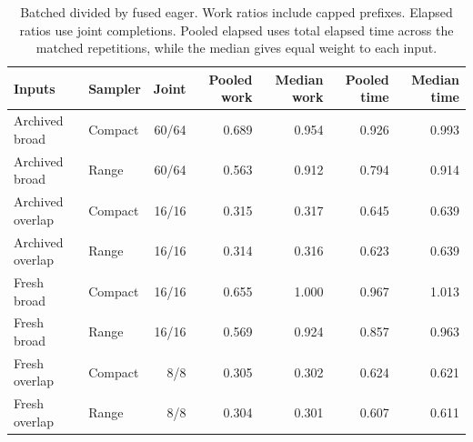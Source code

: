 \begin{table}[ht]\centering\small
\caption{Batched divided by fused eager. Work ratios include capped prefixes. Elapsed ratios use joint completions. Pooled elapsed uses total elapsed time across the matched repetitions, while the median gives equal weight to each input.}
\label{tab:actual-batch}
\begin{tabular}{@{}llrrrrr@{}}\toprule
Inputs & Sampler & Joint & Pooled work & Median work & Pooled time & Median time\\\midrule
Archived broad & Compact & 60/64 & 0.689 & 0.954 & 0.926 & 0.993\\
Archived broad & Range & 60/64 & 0.563 & 0.912 & 0.794 & 0.914\\
Archived overlap & Compact & 16/16 & 0.315 & 0.317 & 0.645 & 0.639\\
Archived overlap & Range & 16/16 & 0.314 & 0.316 & 0.623 & 0.639\\
Fresh broad & Compact & 16/16 & 0.655 & 1.000 & 0.967 & 1.013\\
Fresh broad & Range & 16/16 & 0.569 & 0.924 & 0.857 & 0.963\\
Fresh overlap & Compact & 8/8 & 0.305 & 0.302 & 0.624 & 0.621\\
Fresh overlap & Range & 8/8 & 0.304 & 0.301 & 0.607 & 0.611\\
\bottomrule\end{tabular}\end{table}
